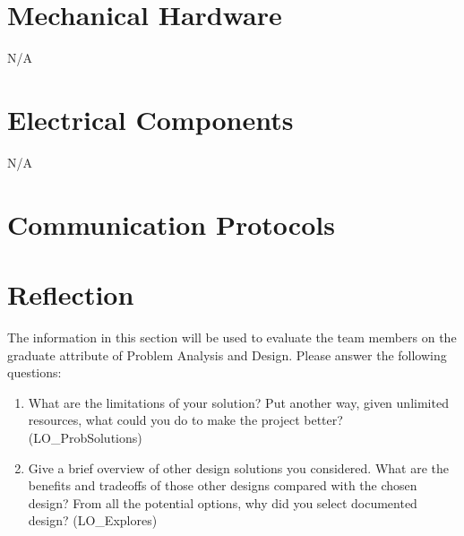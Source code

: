 \documentclass[12pt, titlepage]{article}
\begin{document}

\section{Mechanical Hardware}

N/A

\section{Electrical Components}

N/A

\section{Communication Protocols}

\section{Reflection}

The information in this section will be used to evaluate the team members on the
graduate attribute of Problem Analysis and Design.  Please answer the following questions:

\begin{enumerate}
  \item What are the limitations of your solution?  Put another way, given
  unlimited resources, what could you do to make the project better? (LO\_ProbSolutions)
  \item Give a brief overview of other design solutions you considered.  What
  are the benefits and tradeoffs of those other designs compared with the chosen
  design?  From all the potential options, why did you select documented design?
  (LO\_Explores)
\end{enumerate}
\end{document}
